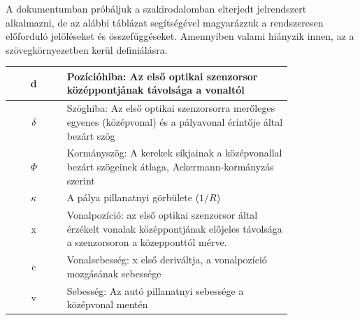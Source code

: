 A dokumentumban próbáljuk a szakirodalomban elterjedt jelrendszert alkalmazni, de az alábbi táblázat segítségével magyarázzuk a rendszeresen előforduló jelöléseket és összefüggéseket. Amennyiben valami hiányzik innen, az a szövegkörnyezetben kerül definiálásra.

\begin{center}
  \begin{tabular}{| c | p{0.8\linewidth} |}
\hline
    d & Pozícióhiba: Az első optikai szenzorsor középpontjának távolsága a vonaltól \\ \hline
    $ \delta $ & Szöghiba: Az első optikai szenzorsorra merőleges egyenes (középvonal) és a pályavonal érintője által bezárt szög \\ \hline
    $ \Phi $ & Kormányszög: A kerekek síkjainak a középvonallal bezárt szögeinek átlaga, Ackermann-kormányzás szerint \\
    \hline
    $ \kappa $ & A pálya pillanatnyi görbülete ($1/R$) \\ \hline
    x & Vonalpozíció: az első optikai szenzorsor által érzékelt vonalak középpontjának előjeles távolsága a szenzorsoron a közepponttól mérve. \\ \hline
    c & Vonalsebesség: x első deriváltja, a vonalpozíció mozgásának sebessége \\ \hline
    v & Sebesség: Az autó pillanatnyi sebessége a középvonal mentén \\
    \hline
  \end{tabular}
\end{center}